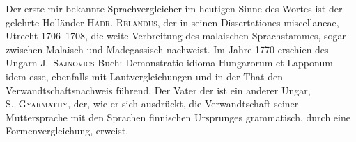 Der erste mir bekannte Sprachvergleicher im heutigen Sinne des \label{fp.26} Wortes ist der gelehrte Holländer \textsc{Hadr. Relandus}, der in seinen Dissertationes miscellaneae, Utrecht 1706–1708, die weite Verbreitung des malaischen Sprachstammes, sogar  zwischen Malaisch und Madegassisch nachweist. Im Jahre 1770 erschien des Ungarn \textsc{J.~Sajnovics} Buch: Demonstratio idioma Hungarorum et Lapponum idem esse, ebenfalls mit Lautvergleichungen und in der That den Verwandtschaftsnachweis führend. Der Vater der  ist ein anderer Ungar, \textsc{S.~Gyarmathy}, der, wie er sich ausdrückt, die Verwandtschaft seiner Muttersprache mit den Sprachen finnischen Ursprunges grammatisch, durch eine Formenvergleichung, erweist.

